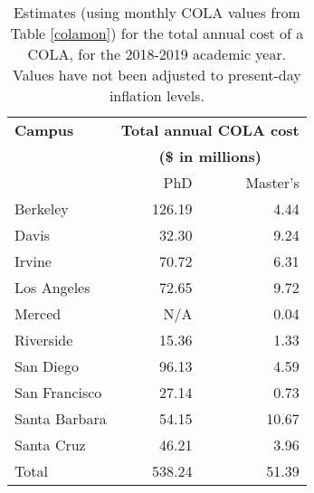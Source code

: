 \documentclass{article}
\begin{document}
\begin{table}[ht]
\centering
\begin{tabular}{@{}lrr@{}}
\toprule
\textbf{Campus} & \multicolumn{2}{c}{\textbf{Total annual COLA cost}} \\ 
	        & \multicolumn{2}{c}{\textbf{(\$ in millions)}} \\ \midrule
                & PhD                         & Master’s                   \\
Berkeley        & 126.19                   & 4.44                   \\
Davis           & 32.30                    & 9.24                   \\
Irvine          & 70.72                    & 6.31                   \\
Los Angeles     & 72.65                    & 9.72                   \\
Merced          & N/A                      & 0.04                      \\
Riverside       & 15.36                    & 1.33                    \\
San Diego       & 96.13                    & 4.59                   \\
San Francisco   & 27.14                    & 0.73                     \\
Santa Barbara   & 54.15                    & 10.67                   \\
Santa Cruz      & 46.21                    & 3.96                   \\
Total           & 538.24                   & 51.39                  \\ \bottomrule
\end{tabular}
\caption{Estimates (using monthly COLA values from Table \ref{colamon}) for the total annual cost of a COLA, for the 2018-2019 academic year. Values have not been adjusted to present-day inflation levels.}
\label{colaann}
\end{table}

\newpage
\end{document}
